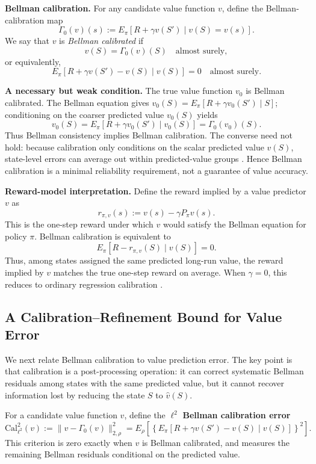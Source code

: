 \documentclass{article}
\theoremstyle{plain}
\theoremstyle{definition}
\theoremstyle{remark}
\begin{document}
\textbf{Bellman calibration.}
For any candidate value function \(v\), define the Bellman-calibration map
\begin{equation}
\label{eqn::calibrationmap}
\Gamma_0(v)(s)
:=
E_\pi\!\left[R+\gamma v(S') \mid v(S)=v(s)\right].
\end{equation}
We say that \(v\) is \emph{Bellman calibrated} if
\[
v(S)=\Gamma_0(v)(S)\quad\text{almost surely},
\]
or equivalently,
\[
E_\pi\!\left[R+\gamma v(S')-v(S)\mid v(S)\right]=0
\quad\text{almost surely}.
\]
 

\textbf{A necessary but weak condition.}
The true value function \(v_0\) is Bellman calibrated. The Bellman equation gives
\(v_0(S)=E_\pi[R+\gamma v_0(S')\mid S]\); conditioning on the coarser predicted value
\(v_0(S)\) yields
\[
v_0(S)
=
E_\pi[R+\gamma v_0(S')\mid v_0(S)]
=
\Gamma_0(v_0)(S).
\]
Thus Bellman consistency implies Bellman calibration. The converse need not
hold: because calibration only conditions on the scalar predicted value \(v(S)\),
state-level errors can average out within predicted-value groups
\citep{gupta2020distribution,van2023causal}. Hence Bellman calibration is a
minimal reliability requirement, not a guarantee of value accuracy.

\textbf{Reward-model interpretation.}
Define the reward implied by a value predictor \(v\) as
\[
r_{\pi,v}(s):=v(s)-\gamma P_\pi v(s).
\]
This is the one-step reward under which \(v\) would satisfy the Bellman
equation for policy \(\pi\). Bellman calibration is equivalent to
\[
E_\pi\!\left[R-r_{\pi,v}(S)\mid v(S)\right]=0.
\]
Thus, among states assigned the same predicted long-run value, the reward
implied by \(v\) matches the true one-step reward on average. When
\(\gamma=0\), this reduces to ordinary regression calibration
\citep{roth2022uncertain}.

\subsection{A Calibration--Refinement Bound for Value Error}

We next relate Bellman calibration to value prediction error. The key point is
that calibration is a post-processing operation: it can correct systematic
Bellman residuals among states with the same predicted value, but it cannot
recover information lost by reducing the state \(S\) to \(\hat v(S)\).

For a candidate value function \(v\), define the \(\ell^2\) \textbf{Bellman calibration
error}
\begin{equation}
\label{eqn::calerror}
\mathrm{Cal}_{\ell^2}^2(v)
:=
\|v-\Gamma_0(v)\|_{2,\rho}^2
=
E_\rho\!\left[
  \left\{
    E_\pi[R+\gamma v(S')-v(S)\mid v(S)]
  \right\}^2
\right].
\end{equation}
This criterion is zero exactly when \(v\) is Bellman calibrated, and measures
the remaining Bellman residuals conditional on the predicted value.
\end{document}
